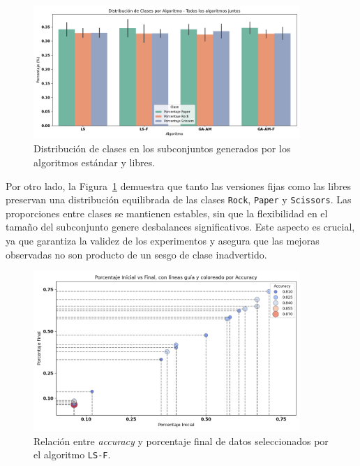 \begin{figure}[htp]
    \centering
    \includegraphics[width=0.9\textwidth]{imagenes/evaluaciones/libres/distribucion-clases.png}
    \caption{Distribución de clases en los subconjuntos generados por los algoritmos estándar y libres.}
    \label{fig:distribucion_libres}
\end{figure}

Por otro lado, la Figura~\ref{fig:distribucion_libres} demuestra que tanto las versiones fijas como las libres preservan una
distribución equilibrada de las clases \texttt{Rock}, \texttt{Paper} y \texttt{Scissors}.
Las proporciones entre clases se mantienen estables, sin que la flexibilidad en el tamaño del subconjunto genere desbalances significativos.
Este aspecto es crucial, ya que garantiza la validez de los experimentos y asegura que las mejoras observadas no son producto de un sesgo de clase inadvertido.


\begin{figure}[htp]
    \centering
    \includegraphics[width=0.9\textwidth]{imagenes/evaluaciones/libres/scatter_ls-f.png}
    \caption{Relación entre \textit{accuracy} y porcentaje final de datos seleccionados por el algoritmo \texttt{LS-F}.}
    \label{fig:scatter_bl_f}
\end{figure}

